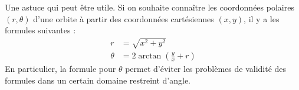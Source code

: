 \bigskip

Une astuce qui peut être utile. Si on souhaite connaître les coordonnées polaires $(r,\theta)$ d'une orbite à partir des coordonnées cartésiennes $(x,y)$, il y a les formules suivantes : 
\begin{subequations}
\begin{align}
r &= \sqrt{x^2 + y^2}\\
\theta &= 2 \arctan\left(\frac{y}{x} + r\right)
\end{align}
\end{subequations}
En particulier, la formule pour $\theta$ permet d'éviter les problèmes de validité des formules dans un certain domaine restreint d'angle. 